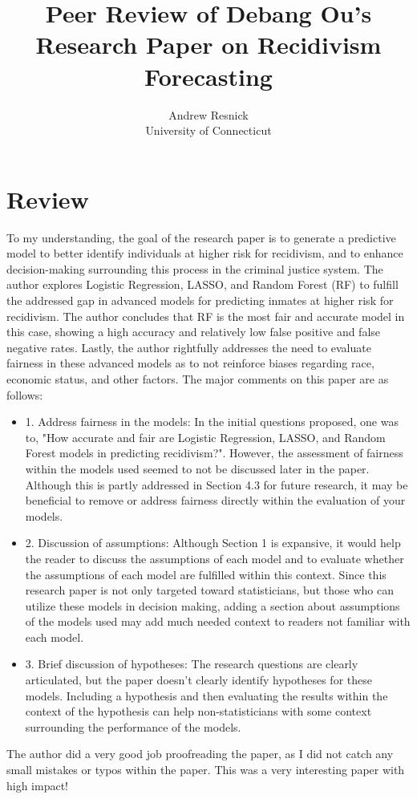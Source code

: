 \documentclass[12pt]{article}
\title{Peer Review of Debang Ou's Research Paper on Recidivism Forecasting}
\author{Andrew Resnick\\
  University of Connecticut
}
\begin{document}
\maketitle

\section{Review}
To my understanding, the goal of the research paper is to generate a predictive model to better identify individuals at higher risk for recidivism, and to enhance decision-making surrounding this process in the criminal justice system.
The author explores Logistic Regression, LASSO, and Random Forest (RF) to fulfill the addressed gap in advanced models for predicting inmates at higher risk for recidivism.
The author concludes that RF is the most fair and accurate model in this case, showing a high accuracy and relatively low false positive and false negative rates.
Lastly, the author rightfully addresses the need to evaluate fairness in these advanced models as to not reinforce biases regarding race, economic status, and other factors.
The major comments on this paper are as follows:
\begin{itemize}
\item 1. Address fairness in the models: In the initial questions proposed, one was to, "How accurate and fair are Logistic Regression, LASSO, and Random Forest
    models in predicting recidivism?". However, the assessment of fairness within the models used seemed to not be discussed later in the paper. Although this is partly addressed in Section 4.3 for future research, it may be beneficial to remove or address fairness directly within the evaluation of your models.  

\item 2. Discussion of assumptions: Although Section 1 is expansive, it would help the reader to discuss the assumptions of each model and to evaluate whether the assumptions of each model are fulfilled within this context. Since this research paper is not only targeted toward statisticians, but those who can utilize these models in decision making, adding a section about assumptions of the models used may add much needed context to readers not familiar with each model. 

\item 3. Brief discussion of hypotheses: The research questions are clearly articulated, but the paper doesn't clearly identify hypotheses for these models. Including a hypothesis and then evaluating the results within the context of the hypothesis can help non-statisticians with some context surrounding the performance of the models.
\end{itemize}
The author did a very good job proofreading the paper, as I did not catch any small mistakes or typos within the paper. This was a very interesting paper with high impact!
\end{document}

